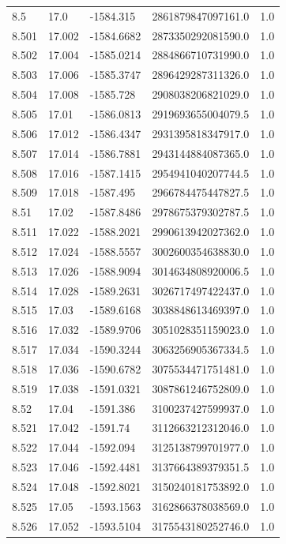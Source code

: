 \begin{tabular}{lllll}
8.5 & 17.0 & -1584.315 & 2861879847097161.0 & 1.0 \\
8.501 & 17.002 & -1584.6682 & 2873350292081590.0 & 1.0 \\
8.502 & 17.004 & -1585.0214 & 2884866710731990.0 & 1.0 \\
8.503 & 17.006 & -1585.3747 & 2896429287311326.0 & 1.0 \\
8.504 & 17.008 & -1585.728 & 2908038206821029.0 & 1.0 \\
8.505 & 17.01 & -1586.0813 & 2919693655004079.5 & 1.0 \\
8.506 & 17.012 & -1586.4347 & 2931395818347917.0 & 1.0 \\
8.507 & 17.014 & -1586.7881 & 2943144884087365.0 & 1.0 \\
8.508 & 17.016 & -1587.1415 & 2954941040207744.5 & 1.0 \\
8.509 & 17.018 & -1587.495 & 2966784475447827.5 & 1.0 \\
8.51 & 17.02 & -1587.8486 & 2978675379302787.5 & 1.0 \\
8.511 & 17.022 & -1588.2021 & 2990613942027362.0 & 1.0 \\
8.512 & 17.024 & -1588.5557 & 3002600354638830.0 & 1.0 \\
8.513 & 17.026 & -1588.9094 & 3014634808920006.5 & 1.0 \\
8.514 & 17.028 & -1589.2631 & 3026717497422437.0 & 1.0 \\
8.515 & 17.03 & -1589.6168 & 3038848613469397.0 & 1.0 \\
8.516 & 17.032 & -1589.9706 & 3051028351159023.0 & 1.0 \\
8.517 & 17.034 & -1590.3244 & 3063256905367334.5 & 1.0 \\
8.518 & 17.036 & -1590.6782 & 3075534471751481.0 & 1.0 \\
8.519 & 17.038 & -1591.0321 & 3087861246752809.0 & 1.0 \\
8.52 & 17.04 & -1591.386 & 3100237427599937.0 & 1.0 \\
8.521 & 17.042 & -1591.74 & 3112663212312046.0 & 1.0 \\
8.522 & 17.044 & -1592.094 & 3125138799701977.0 & 1.0 \\
8.523 & 17.046 & -1592.4481 & 3137664389379351.5 & 1.0 \\
8.524 & 17.048 & -1592.8021 & 3150240181753892.0 & 1.0 \\
8.525 & 17.05 & -1593.1563 & 3162866378038569.0 & 1.0 \\
8.526 & 17.052 & -1593.5104 & 3175543180252746.0 & 1.0 \\

\end{tabular}
